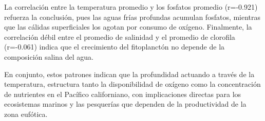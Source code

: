 \tab La correlación entre la temperatura promedio y los fosfatos promedio (r=-0.921) refuerza la conclusión, pues las aguas frías profundas acumulan fosfatos, mientras que las cálidas superficiales los agotan por consumo de oxígeno. Finalmente, la correlación débil entre el promedio de salinidad y el promedio de clorofila (r=-0.061) indica que el crecimiento del fitoplanctón no depende de la composición salina del agua.  

\tab En conjunto, estos patrones indican que la profundidad actuando a través de la temperatura, estructura tanto la disponibilidad de oxígeno como la concentración de nutrientes en el Pacífico californiano, con implicaciones directas para los ecosistemas marinos y las pesquerías que dependen de la productividad de la zona eufótica.  